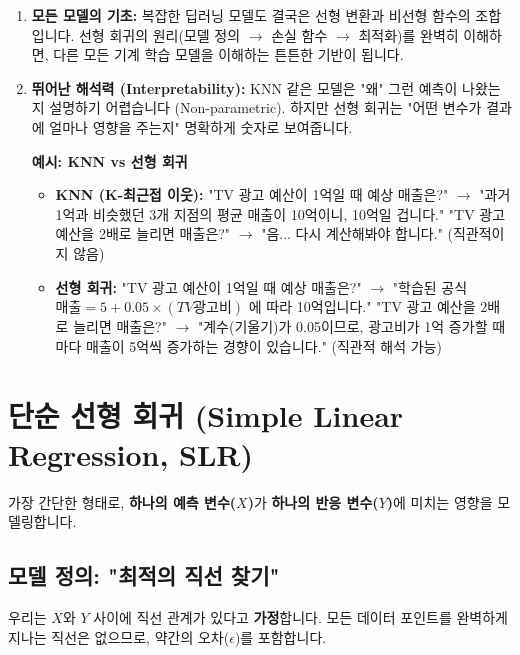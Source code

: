 \documentclass[11pt,a4paper]{book}
\theoremstyle{definition}
\begin{document}
\begin{enumerate}
    \item \textbf{모든 모델의 기초:}
    복잡한 딥러닝 모델도 결국은 선형 변환과 비선형 함수의 조합입니다. 선형 회귀의 원리(모델 정의 $\rightarrow$ 손실 함수 $\rightarrow$ 최적화)를 완벽히 이해하면, 다른 모든 기계 학습 모델을 이해하는 튼튼한 기반이 됩니다.

    \item \textbf{뛰어난 해석력 (Interpretability):}
    KNN 같은 모델은 "왜" 그런 예측이 나왔는지 설명하기 어렵습니다 (Non-parametric). 하지만 선형 회귀는 "어떤 변수가 결과에 얼마나 영향을 주는지" 명확하게 숫자로 보여줍니다.
    
    \begin{examplebox}
    \textbf{예시: KNN vs 선형 회귀}
    \begin{itemize}
        \item \textbf{KNN (K-최근접 이웃):}
        "TV 광고 예산이 1억일 때 예상 매출은?" $\rightarrow$ "과거 1억과 비슷했던 3개 지점의 평균 매출이 10억이니, 10억일 겁니다."
        "TV 광고 예산을 2배로 늘리면 매출은?" $\rightarrow$ "음... 다시 계산해봐야 합니다." (직관적이지 않음)
        
        \item \textbf{선형 회귀:}
        "TV 광고 예산이 1억일 때 예상 매출은?" $\rightarrow$ "학습된 공식 $매출 = 5 + 0.05 \times (TV광고비)$ 에 따라 10억입니다."
        "TV 광고 예산을 2배로 늘리면 매출은?" $\rightarrow$ "계수(기울기)가 0.05이므로, 광고비가 1억 증가할 때마다 매출이 5억씩 증가하는 경향이 있습니다." (직관적 해석 가능)
    \end{itemize}
    \end{examplebox}
\end{enumerate}

\section{단순 선형 회귀 (Simple Linear Regression, SLR)}

가장 간단한 형태로, \textbf{하나의 예측 변수($X$)}가 \textbf{하나의 반응 변수($Y$)}에 미치는 영향을 모델링합니다.

\subsection{모델 정의: "최적의 직선 찾기"}

우리는 $X$와 $Y$ 사이에 직선 관계가 있다고 \textbf{가정}합니다.
모든 데이터 포인트를 완벽하게 지나는 직선은 없으므로, 약간의 오차($\epsilon$)를 포함합니다.
\end{document}

